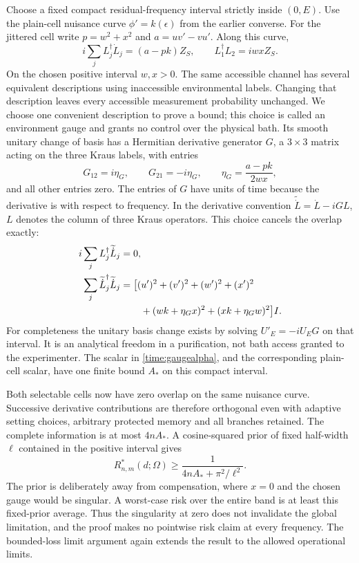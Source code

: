\documentclass[11pt,a4paper]{article}
\numberwithin{equation}{section}
\theoremstyle{remark}
\begin{document}
Choose a fixed compact residual-frequency interval strictly inside $(0,E)$.
Use the plain-cell nuisance curve $\phi'=k(\epsilon)$ from the earlier
converse. For the jittered cell write $p=w^2+x^2$ and $a=uv'-vu'$. Along this
curve,
\begin{equation}
 i\sum_jL_j^\dagger\dot L_j=(a-pk)Z_S,
 \qquad L_1^\dagger L_2=iwxZ_S.
\end{equation}
On the chosen positive interval $w,x>0$. The same accessible channel has
several equivalent descriptions using inaccessible environmental labels.
Changing that description leaves every accessible measurement probability
unchanged. We choose one convenient description to prove a bound; this choice
is called an environment gauge and grants no control over the physical bath.
Its smooth unitary change of basis has a Hermitian derivative generator $G$,
a $3\times3$ matrix acting on the three Kraus labels, with entries
\begin{equation}
 G_{12}=i\eta_G,\qquad G_{21}=-i\eta_G,\qquad
 \eta_G=\frac{a-pk}{2wx},
\end{equation}
and all other entries zero. The entries of $G$ have units of time because
the derivative is with respect to frequency. In the derivative convention
$\widetilde{\dot L}=\dot L-iGL$, $L$ denotes the column of three Kraus
operators. This choice cancels the overlap exactly:
\begin{align}
 i\sum_jL_j^\dagger\widetilde{\dot L}_j&=0,\nonumber\\
 \sum_j\widetilde{\dot L}_j^\dagger\widetilde{\dot L}_j
 &=\bigl[(u')^2+(v')^2+(w')^2+(x')^2\nonumber\\
 &\hspace{2.1em}+(wk+\eta_Gx)^2+(xk+\eta_Gw)^2\bigr]I.
 \label{time:gaugealpha}
\end{align}
For completeness the unitary basis change exists by solving
$U'_E=-iU_EG$ on that interval. It is an analytical freedom in a purification,
not bath access granted to the experimenter. The scalar in
\eqref{time:gaugealpha}, and the corresponding plain-cell scalar, have one
finite bound $A_*$ on this compact interval.

Both selectable cells now have zero overlap on the same nuisance curve.
Successive derivative contributions are therefore orthogonal even with
adaptive setting choices, arbitrary protected memory and all branches
retained. The complete information is at most $4nA_*$. A cosine-squared
prior of fixed half-width $\ell$ contained in the positive interval gives
\begin{equation}
 R_{n,m}^{*}(d;\Omega)\ge
 \frac{1}{4nA_*+\pi^2/\ell^2}.
\end{equation}
The prior is deliberately away from compensation, where $x=0$ and the
chosen gauge would be singular. A worst-case risk over the entire band is
at least this fixed-prior average. Thus the singularity at zero does not
invalidate the global limitation, and the proof makes no pointwise risk
claim at every frequency. The bounded-loss limit argument again extends the
result to the allowed operational limits.
\end{document}
